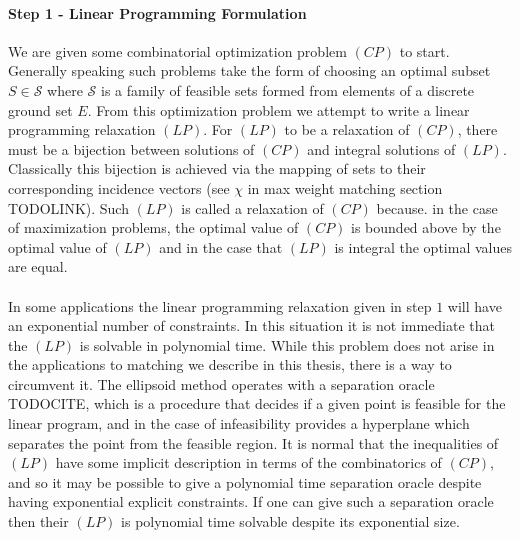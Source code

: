 \paragraph{Step 1 - Linear Programming Formulation}
We are given some combinatorial optimization  problem $(CP)$ to start. Generally speaking such problems take the form of choosing an optimal subset $S \in \mathcal{S}$ where $\mathcal{S}$ is a family of feasible sets formed from elements of a discrete ground set $E$. From this optimization problem we attempt to write a linear programming relaxation $(LP)$. For $(LP)$ to be a relaxation of $(CP)$, there must be a bijection between solutions of $(CP)$ and integral solutions of $(LP)$. Classically this bijection is achieved via the mapping of sets to their corresponding incidence vectors (see $\chi$ in max weight matching section TODOLINK). Such $(LP)$ is called a relaxation of $(CP)$ because. in the case of maximization problems, the optimal value of $(CP)$ is bounded above by the optimal value of $(LP)$ and in the case that $(LP)$ is integral the optimal values are equal.
\paragraph{}
In some applications the linear programming relaxation given in step $1$ will have an exponential number of constraints. In this situation it is not immediate that the $(LP)$ is solvable in polynomial time. While this problem does not arise in the applications to matching we describe in this thesis, there is a way to circumvent it. The ellipsoid method operates with a separation oracle TODOCITE, which is a procedure that decides if a given point is feasible for the linear program, and in the case of infeasibility provides a hyperplane which separates the point from the feasible region. It is normal that the inequalities of $(LP)$ have some implicit description in terms of the combinatorics of $(CP)$, and so it may be possible to give a polynomial time separation oracle despite having exponential explicit constraints. If one can give such a separation oracle then their $(LP)$ is polynomial time solvable despite its exponential size.
